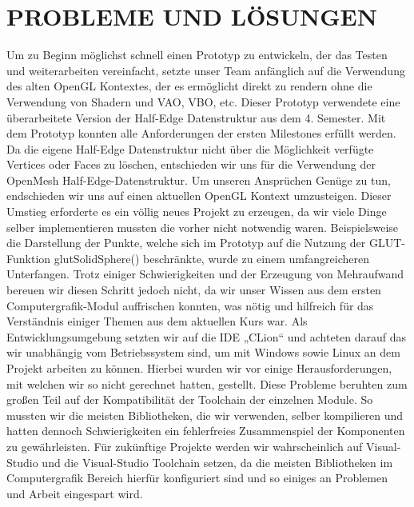 	
	\section{\Large PROBLEME UND LÖSUNGEN}
Um zu Beginn möglichst schnell einen Prototyp zu entwickeln, der das Testen und weiterarbeiten vereinfacht, setzte unser Team anfänglich auf die Verwendung des alten OpenGL Kontextes, der es ermöglicht direkt zu rendern ohne die Verwendung von Shadern und VAO, VBO, etc. Dieser Prototyp verwendete eine überarbeitete Version der Half-Edge Datenstruktur aus dem 4. Semester. Mit dem Prototyp konnten alle Anforderungen der ersten Milestones erfüllt werden. \newline
Da die eigene Half-Edge Datenstruktur nicht über die Möglichkeit verfügte Vertices oder Faces zu löschen, entschieden wir uns für die Verwendung der OpenMesh Half-Edge-Datenstruktur.\newline
Um unseren Ansprüchen Genüge zu tun, endschieden wir uns auf einen aktuellen OpenGL Kontext umzusteigen. Dieser Umstieg erforderte es ein völlig neues Projekt zu erzeugen, da wir viele Dinge selber implementieren mussten die vorher nicht notwendig waren. Beispielsweise die Darstellung der Punkte, welche sich im Prototyp auf die Nutzung der GLUT-Funktion glutSolidSphere() beschränkte, wurde zu einem umfangreicheren Unterfangen. Trotz einiger Schwierigkeiten und der Erzeugung von Mehraufwand bereuen wir diesen Schritt jedoch nicht, da wir unser Wissen aus dem ersten Computergrafik-Modul auffrischen konnten, was nötig und hilfreich für das Verständnis einiger Themen aus dem aktuellen Kurs war.\newline
Als Entwicklungsumgebung setzten wir auf die IDE „CLion“ und achteten darauf das wir unabhängig vom Betriebssystem sind, um mit Windows sowie Linux an dem Projekt arbeiten zu können. Hierbei wurden wir vor einige Herausforderungen, mit welchen wir so nicht gerechnet hatten, gestellt. Diese Probleme beruhten zum großen Teil auf der Kompatibilität der Toolchain der einzelnen Module. So mussten wir die meisten Bibliotheken, die wir verwenden, selber kompilieren und hatten dennoch Schwierigkeiten ein fehlerfreies Zusammenspiel der Komponenten zu gewährleisten. Für zukünftige Projekte werden wir wahrscheinlich auf Visual-Studio und die Visual-Studio Toolchain setzen, da die meisten Bibliotheken im Computergrafik Bereich hierfür konfiguriert sind und so einiges an Problemen und Arbeit eingespart wird.




